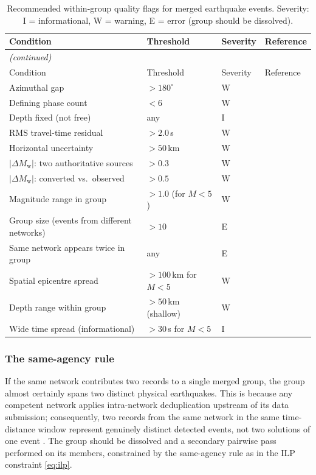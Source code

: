 \documentclass[12pt]{article}
\begin{document}
\begin{longtable}{p{4.0cm}p{2.4cm}lp{3.5cm}}
  \caption{Recommended within-group quality flags for merged earthquake events.
           Severity: I = informational, W = warning, E = error (group should be
           dissolved).}
  \label{tab:qcflags} \\
  \toprule
  Condition & Threshold & Severity & Reference \\
  \midrule
  \endfirsthead
  \multicolumn{4}{l}{\small\textit{(continued)}} \\
  \toprule
  Condition & Threshold & Severity & Reference \\
  \midrule
  \endhead
  \bottomrule
  \endfoot
  Azimuthal gap & $> 180^\circ$ & W & \citet{Bondar2011} \\
  Defining phase count & $< 6$ & W & \citet{Bondar2011} \\
  Depth fixed (not free) & any & I & \citet{Engdahl2020} \\
  RMS travel-time residual & $> 2.0$\,s & W & \citet{ISCBulletinRebuild2020} \\
  Horizontal uncertainty & $> 50$\,km & W & \citet{Bondar2004} \\
  $|\Delta M_\mathrm{w}|$: two authoritative sources & $> 0.3$ & W & \citet{Si2024} \\
  $|\Delta M_\mathrm{w}|$: converted vs.\ observed & $> 0.5$ & W & \citet{Grunthal2016} \\
  Magnitude range in group & $> 1.0$ (for $M < 5$) & W & \citet{Tanaka2022} \\
  Group size (events from different networks) & $> 10$ & E & \citet{Patton2016} \\
  Same network appears twice in group & any & E & \citet{Patton2016} \\
  Spatial epicentre spread & $> 100$\,km for $M < 5$ & W & \citet{Patton2016} \\
  Depth range within group & $> 50$\,km (shallow) & W & \citet{ISCGEM2018} \\
  Wide time spread (informational) & $> 30$\,s for $M < 5$ & I & \citet{ISCGEM2018} \\
\end{longtable}

\subsubsection{The same-agency rule}
\label{sec:sameagency}

If the same network contributes two records to a single merged group, the group
almost certainly spans two distinct physical earthquakes.  This is because any
competent network applies intra-network deduplication upstream of its data
submission; consequently, two records from the same network in the same time-
distance window represent genuinely distinct detected events, not two solutions
of one event \citep{Patton2016}.  The group should be dissolved and a secondary
pairwise pass performed on its members, constrained by the same-agency rule as
in the ILP constraint \eqref{eq:ilp}.
\end{document}
